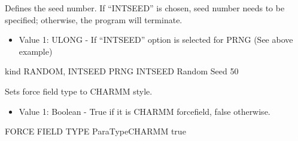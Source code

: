 \documentclass[letterpaper,10pt,english]{sphinxmanual}
\begin{document}
\begin{description}
\begin{itemize}
\begin{itemize}
\end{itemize}

\end{itemize}

\item[{\sphinxcode{\sphinxupquote{Random\_Seed}}}] \leavevmode
Defines the seed number. If “INTSEED” is chosen, seed number needs to be specified; otherwise, the program will terminate.
\begin{itemize}
\item {} 
Value 1: ULONG - If “INTSEED” option is selected for PRNG (See above example)

\end{itemize}

%
\begin{sphinxVerbatim}[commandchars=\\\{\}]
\PYGZsh{}\PYGZsh{}\PYGZsh{}\PYGZsh{}\PYGZsh{}\PYGZsh{}\PYGZsh{}\PYGZsh{}\PYGZsh{}\PYGZsh{}\PYGZsh{}\PYGZsh{}\PYGZsh{}\PYGZsh{}\PYGZsh{}\PYGZsh{}\PYGZsh{}\PYGZsh{}\PYGZsh{}\PYGZsh{}\PYGZsh{}\PYGZsh{}\PYGZsh{}\PYGZsh{}\PYGZsh{}\PYGZsh{}\PYGZsh{}\PYGZsh{}\PYGZsh{}\PYGZsh{}\PYGZsh{}\PYGZsh{}\PYGZsh{}
\PYGZsh{} kind \PYGZob{}RANDOM, INTSEED\PYGZcb{}
\PYGZsh{}\PYGZsh{}\PYGZsh{}\PYGZsh{}\PYGZsh{}\PYGZsh{}\PYGZsh{}\PYGZsh{}\PYGZsh{}\PYGZsh{}\PYGZsh{}\PYGZsh{}\PYGZsh{}\PYGZsh{}\PYGZsh{}\PYGZsh{}\PYGZsh{}\PYGZsh{}\PYGZsh{}\PYGZsh{}\PYGZsh{}\PYGZsh{}\PYGZsh{}\PYGZsh{}\PYGZsh{}\PYGZsh{}\PYGZsh{}\PYGZsh{}\PYGZsh{}\PYGZsh{}\PYGZsh{}\PYGZsh{}\PYGZsh{}
PRNG INTSEED
Random Seed 50
\end{sphinxVerbatim}

\item[{\sphinxcode{\sphinxupquote{ParaTypeCHARMM}}}] \leavevmode
Sets force field type to CHARMM style.
\begin{itemize}
\item {} 
Value 1: Boolean - True if it is CHARMM forcefield, false otherwise.

\end{itemize}

%
\begin{sphinxVerbatim}[commandchars=\\\{\}]
\PYGZsh{}\PYGZsh{}\PYGZsh{}\PYGZsh{}\PYGZsh{}\PYGZsh{}\PYGZsh{}\PYGZsh{}\PYGZsh{}\PYGZsh{}\PYGZsh{}\PYGZsh{}\PYGZsh{}\PYGZsh{}\PYGZsh{}\PYGZsh{}\PYGZsh{}\PYGZsh{}\PYGZsh{}\PYGZsh{}\PYGZsh{}\PYGZsh{}\PYGZsh{}\PYGZsh{}\PYGZsh{}\PYGZsh{}\PYGZsh{}\PYGZsh{}\PYGZsh{}\PYGZsh{}\PYGZsh{}\PYGZsh{}\PYGZsh{}
\PYGZsh{} FORCE FIELD TYPE
\PYGZsh{}\PYGZsh{}\PYGZsh{}\PYGZsh{}\PYGZsh{}\PYGZsh{}\PYGZsh{}\PYGZsh{}\PYGZsh{}\PYGZsh{}\PYGZsh{}\PYGZsh{}\PYGZsh{}\PYGZsh{}\PYGZsh{}\PYGZsh{}\PYGZsh{}\PYGZsh{}\PYGZsh{}\PYGZsh{}\PYGZsh{}\PYGZsh{}\PYGZsh{}\PYGZsh{}\PYGZsh{}\PYGZsh{}\PYGZsh{}\PYGZsh{}\PYGZsh{}\PYGZsh{}\PYGZsh{}\PYGZsh{}\PYGZsh{}
ParaTypeCHARMM true
\end{sphinxVerbatim}


\end{description}
\end{document}
